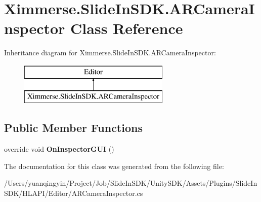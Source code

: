 \hypertarget{class_ximmerse_1_1_slide_in_s_d_k_1_1_a_r_camera_inspector}{}\section{Ximmerse.\+Slide\+In\+S\+D\+K.\+A\+R\+Camera\+Inspector Class Reference}
\label{class_ximmerse_1_1_slide_in_s_d_k_1_1_a_r_camera_inspector}
Inheritance diagram for Ximmerse.\+Slide\+In\+S\+D\+K.\+A\+R\+Camera\+Inspector\+:\begin{figure}[H]
\begin{center}
\leavevmode
\includegraphics[height=2.000000cm]{class_ximmerse_1_1_slide_in_s_d_k_1_1_a_r_camera_inspector}
\end{center}
\end{figure}
\subsection*{Public Member Functions}
\begin{DoxyCompactItemize}
\item 
\mbox{\label{class_ximmerse_1_1_slide_in_s_d_k_1_1_a_r_camera_inspector_ab6e232ee2dc7e9727fd3479240743f56}} 
override void {\bfseries On\+Inspector\+G\+UI} ()
\end{DoxyCompactItemize}


The documentation for this class was generated from the following file\+:\begin{DoxyCompactItemize}
\item 
/\+Users/yuanqingyin/\+Project/\+Job/\+Slide\+In\+S\+D\+K/\+Unity\+S\+D\+K/\+Assets/\+Plugins/\+Slide\+In\+S\+D\+K/\+H\+L\+A\+P\+I/\+Editor/A\+R\+Camera\+Inspector.\+cs\end{DoxyCompactItemize}
